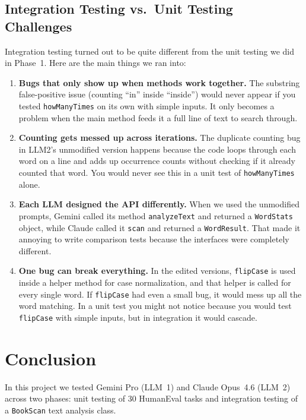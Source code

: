 \documentclass[12pt, a4paper]{article}
\begin{document}
\subsection{Integration Testing vs.\ Unit Testing Challenges}

Integration testing turned out to be quite different from the unit testing we did in Phase~1. Here are the main things we ran into:

\begin{enumerate}
    \item \textbf{Bugs that only show up when methods work together.} The substring false-positive issue (counting ``in'' inside ``inside'') would never appear if you tested \texttt{howManyTimes} on its own with simple inputs. It only becomes a problem when the main method feeds it a full line of text to search through.
    \item \textbf{Counting gets messed up across iterations.} The duplicate counting bug in LLM2's unmodified version happens because the code loops through each word on a line and adds up occurrence counts without checking if it already counted that word. You would never see this in a unit test of \texttt{howManyTimes} alone.
    \item \textbf{Each LLM designed the API differently.} When we used the unmodified prompts, Gemini called its method \texttt{analyzeText} and returned a \texttt{WordStats} object, while Claude called it \texttt{scan} and returned a \texttt{WordResult}. That made it annoying to write comparison tests because the interfaces were completely different.
    \item \textbf{One bug can break everything.} In the edited versions, \texttt{flipCase} is used inside a helper method for case normalization, and that helper is called for every single word. If \texttt{flipCase} had even a small bug, it would mess up all the word matching. In a unit test you might not notice because you would test \texttt{flipCase} with simple inputs, but in integration it would cascade.
\end{enumerate}

\section{Conclusion}
\label{sec:conclusion}

In this project we tested Gemini Pro (LLM~1) and Claude Opus~4.6 (LLM~2) across two phases: unit testing of 30 HumanEval tasks and integration testing of a \texttt{BookScan} text analysis class.
\end{document}
